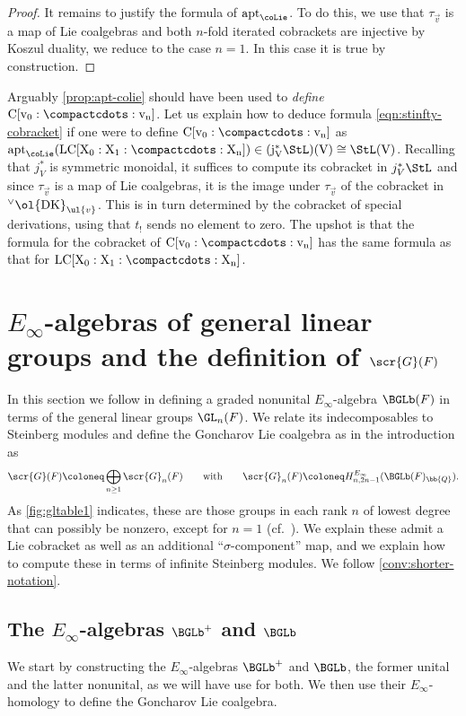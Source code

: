 \documentclass[a4paper]{amsart}
\begin{document}
\begin{proof}It remains to justify the formula of $\rm{apt}_{\coLie}$. To do this, we use that $\tau_{\vec{v}}$ is a map of Lie coalgebras and both $n$-fold iterated cobrackets are injective by Koszul duality, we reduce to the case $n=1$. In this case it is true by construction.\end{proof}

\begin{remark}\label{rem:c-sder-cobracket}
Arguably \cref{prop:apt-colie} should have been used to \emph{define} $\rm{C}[v_0: \compactcdots : v_n]$. Let us explain how to deduce formula \eqref{eqn:stinfty-cobracket} if one were to define $\rm{C}[v_0:\compactcdots:v_n]$ as $\rm{apt}_{\coLie}(\rm{LC}[X_0:X_1:\compactcdots:X_n]) \in (j^*_V \StL)(V) \cong \StL(V)$. Recalling that $j_V^*$ is symmetric monoidal, it suffices to compute its cobracket in $j^*_V \StL$ and since $\tau_{\vec{v}}$ is a map of Lie coalgebras, it is the image under $\tau_{\vec{v}}$ of the cobracket in ${}^\vee \ol{\rm{DK}}_{\ul{v}}$. This is in turn determined by the cobracket of special derivations, using that $t_!$ sends no element to zero. The upshot is that the formula for the cobracket of $\rm{C}[v_0:\compactcdots:v_n]$ has the same formula as that for $\rm{LC}[X_0:X_1:\compactcdots:X_n]$.\end{remark}



\section{$E_\infty$-algebras of general linear groups and the definition of $\scr{G}(F)$} In this section we follow \cite{GKRW20} in defining a graded nonunital $E_\infty$-algebra $\BGLb(F)$ in terms of the general linear groups $\GL_n(F)$. We relate its indecomposables to Steinberg modules and define the Goncharov Lie coalgebra as in the introduction as
\[\scr{G}(F) \coloneq \bigoplus_{n \geq 1} \scr{G}_n(F) \qquad \text{with} \qquad \scr{G}_n(F) \coloneq H^{E_\infty}_{n,2n-1}(\BGLb(F)_\bb{Q}).\]
As \cref{fig:gltable1} indicates, these are those groups in each rank $n$ of lowest degree that can possibly be nonzero, except for $n=1$ (cf.~\cite[Figure 1]{GKRW20}). We explain these admit a Lie cobracket as well as an additional ``$\sigma$-component'' map, and we explain how to compute these in terms of infinite Steinberg modules. We follow \cref{conv:shorter-notation}.

\subsection{The $E_\infty$-algebras $\BGLb^+$ and $\BGLb$} \label{sec:bgl} We start by constructing the $E_\infty$-algebras $\BGLb^+$ and $\BGLb$, the former unital and the latter nonunital, as we will have use for both. We then use their $E_\infty$-homology to define the Goncharov Lie coalgebra.
\end{document}
